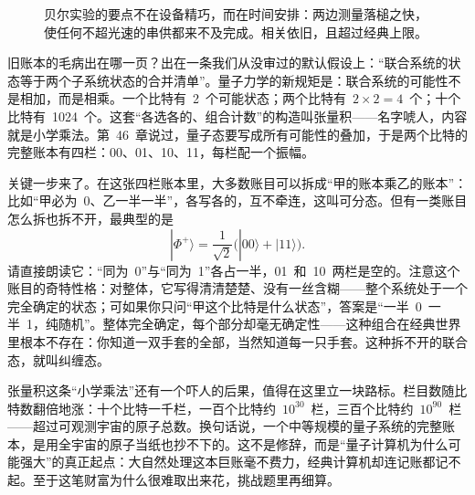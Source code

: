 \begin{figure}[htbp]
\centering
{}
\caption{贝尔实验的要点不在设备精巧，而在时间安排：两边测量落槌之快，使任何不超光速的串供都来不及完成。相关依旧，且超过经典上限。}
\end{figure}


旧账本的毛病出在哪一页？出在一条我们从没审过的默认假设上：“联合系统的状态等于两个子系统状态的合并清单”。量子力学的新规矩是：联合系统的可能性不是相加，而是相乘。一个比特有~2~个可能状态；两个比特有~\(2\times2=4\)~个；十个比特有~1024~个。这套“各选各的、组合计数”的构造叫张量积——名字唬人，内容就是小学乘法。第~46~章说过，量子态要写成所有可能性的叠加，于是两个比特的完整账本有四栏：00、01、10、11，每栏配一个振幅。

关键一步来了。在这张四栏账本里，大多数账目可以拆成“甲的账本乘乙的账本”：比如“甲必为~0、乙一半一半”，各写各的，互不牵连，这叫可分态。但有一类账目怎么拆也拆不开，最典型的是
\[
|\Phi^{+}\rangle=\frac{1}{\sqrt2}\big(|00\rangle+|11\rangle\big).
\]
请直接朗读它：“同为~0”与“同为~1”各占一半，01~和~10~两栏是空的。注意这个账目的奇特性格：对整体，它写得清清楚楚、没有一丝含糊——整个系统处于一个完全确定的状态；可如果你只问“甲这个比特是什么状态”，答案是“一半~0~一半~1，纯随机”。整体完全确定，每个部分却毫无确定性——这种组合在经典世界里根本不存在：你知道一双手套的全部，当然知道每一只手套。这种拆不开的联合态，就叫纠缠态。

张量积这条“小学乘法”还有一个吓人的后果，值得在这里立一块路标。栏目数随比特数翻倍地涨：十个比特一千栏，一百个比特约~\(10^{30}\)~栏，三百个比特约~\(10^{90}\)~栏——超过可观测宇宙的原子总数。换句话说，一个中等规模的量子系统的完整账本，是用全宇宙的原子当纸也抄不下的。这不是修辞，而是“量子计算机为什么可能强大”的真正起点：大自然处理这本巨账毫不费力，经典计算机却连记账都记不起。至于这笔财富为什么很难取出来花，挑战题里再细算。

